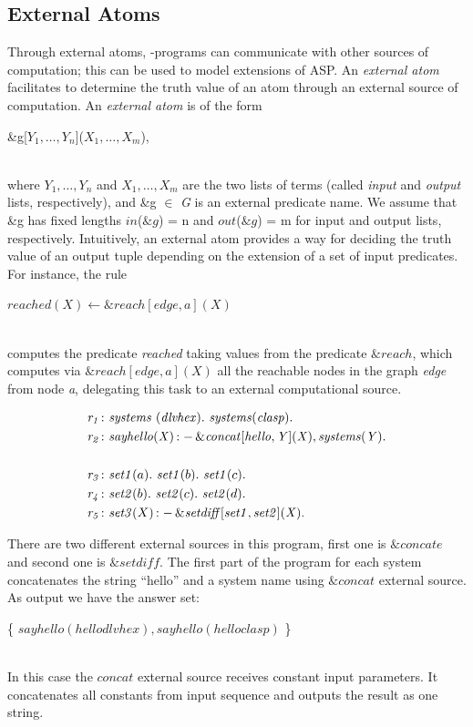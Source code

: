 \documentclass[a4paper, titlepage]{article}
\newcommand{\ext}[3]{\ensuremath{\&{#1}[#2](#3)}}
\DeclareMathOperator{\leftimpl}{:-}
\newcommand{\row}[1]{%
  \ensuremath{\it \color{black} #1 \color{black}}%
}
\begin{document}
\subsection{External Atoms}
\label{extatoms}
Through external atoms, \hex{}-programs can communicate 
with other sources of computation; this can be used to 
model extensions of ASP.  
An \emph{external atom} facilitates to determine the truth 
value of an atom through an external source of computation.
An \emph{external atom} is of the form \\ \centerline{ 
\&g[$Y_1,\dots,Y_n$]($X_1,\dots,X_m$),} \\where $Y_1,
\dots,Y_n$ and $X_1,\dots,X_m$ are the two lists of terms 
(called \textit{input} and \textit{output} lists, 
respectively), and \&g $\in$ \textit{G} is an external 
predicate name. We assume that \&g has fixed lengths 
$in$($\&g$) = n and $out$($\&g$) = m for 
input and output lists, respectively. Intuitively, an 
external atom provides a way for deciding the truth value 
of an output tuple depending on the extension of a set of 
input predicates.
For instance, the rule \\ \centerline{ \textit{$reached(X) 
\leftarrow \&reach[edge,a](X)$}}
\\computes the predicate \textit{reached} taking values 
from the predicate $\&reach$, which computes via 
\textit{$\&reach[edge,a](X)$} all the reachable nodes in 
the graph \textit{edge} from node \textit{a}, 
delegating this task to an external computational source.
\begin{exmp}
\begin{align*}
\row{r_1}\colon& \mathit{systems} \ (\mathit{dlvhex}). \ 
\mathit{systems}(\mathit{clasp}). \\  
\row{r_2}\colon& \mathit{sayhello(X)} \leftimpl 
\ext{\mathit{concat}}{\mathit{hello, Y}}{\mathit{X}}, 
\mathit{systems(Y).}  \\ 
\\
\row{r_3}\colon& \mathit{set1}(a). \ \mathit{set1}(b). \ 
\mathit{set1}(c).\\
\row{r_4}\colon& \mathit{set2}(b). \ \mathit{set2}(c). \ 
\mathit{set2}(d).\\
\row{r_5}\colon& \mathit{set3}(X) \leftimpl 
\ext{\mathit{setdiff}}{\mathit{set1, set2}}{\mathit{X}}. 
\end{align*}
\end{exmp}

There are two different external sources in this program, 
first one is $\mathit{\&concate}$ and second one is 
$\mathit{\&setdiff}$. The first part of the program for each 
system concatenates the string \enquote{hello} and a system 
name using $\mathit{\&concat}$ external source. As output 
we have the answer set:\\ 
\centerline{ \{ $\mathit{sayhello}(\mathit{hellodlvhex}), 
\mathit{sayhello}(\mathit{helloclasp})$ \}}
\\In this case the $\mathit{concat}$ external source receives 
constant input parameters. It concatenates all constants from input sequence and outputs the result as one string.
\end{document}
